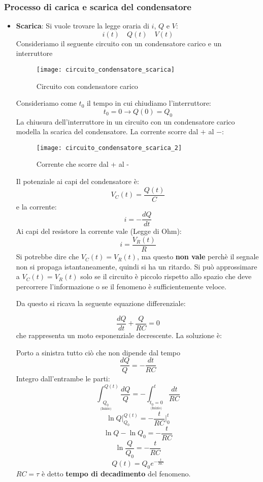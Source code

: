 \documentclass[a4paper]{article}
\begin{document}
\subsubsection{Processo di carica e scarica del condensatore}
\begin{itemize}
  \item \textbf{Scarica}: Si vuole trovare la legge oraria di \( i \), \( Q \) e \( V \):
    \[
      i(t) \quad Q(t) \quad V(t)
    \] 
    Consideriamo il seguente circuito con un condensatore carico e un interruttore
    \begin{figure}[H]
      \centering
      \texttt{[image: circuito\_condensatore\_scarica]}
      \caption{Circuito con condensatore carico}
    \end{figure}
    \noindent
    Consideriamo come \( t_0 \) il tempo in cui chiudiamo l'interruttore:
    \[
      t_0 = 0 \to Q(0) = Q_0
    \] 
    La chiusura dell'interruttore in un circuito con un condensatore carico modella
    la scarica del condensatore. La corrente scorre dal \( + \) al \( - \):
    \begin{figure}[H]
      \centering
      \texttt{[image: circuito\_condensatore\_scarica\_2]}
      \caption{Corrente che scorre dal + al -}
    \end{figure}
    \noindent
    Il potenziale ai capi del condensatore è:
    \[
      V_C(t) = \frac{Q(t)}{C}
    \] 
    e la corrente:
    \[
      i = - \frac{dQ}{dt}
    \] 
    Ai capi del resistore la corrente vale (Legge di Ohm):
    \[
      i = \frac{V_R(t)}{R}
    \] 
    Si potrebbe dire che \( V_C(t) = V_R(t) \), ma questo \textbf{non vale} perchè il segnale
    non si propaga istantaneamente, quindi si ha un ritardo. Si può approssimare
    a \( V_C(t) = V_R(t) \) solo se il circuito è piccolo rispetto allo spazio che 
    deve percorrere l'informazione o se il fenomeno è sufficientemente veloce.

    \vspace{1em}
    \noindent
    Da questo si ricava la seguente equazione differenziale:
    \begin{definition}
    \[
      \frac{dQ}{dt} + \frac{Q}{RC} = 0
    \] 
    che rappresenta un moto esponenziale decrescente. La soluzione è:

    Porto a sinistra tutto ciò che non dipende dal tempo
    \[
      \frac{dQ}{Q} = -\frac{dt}{RC}
    \] 
    Integro dall'entrambe le parti:
    \[
      \int_{\underset{\text{(Inizio)}}{Q_0}}^{Q(t)} \frac{dQ}{Q}
      = -\int_{\underset{\text{(Inizio)}}{t_0 = 0}}^t \frac{dt}{RC}
    \] 
    \[
      \ln Q \bigg|_{Q_0}^{Q(t)} = -\frac{t}{RC} \bigg|_{0}^{t}
    \] 
    \[
      \ln Q - \ln Q_0 = -\frac{t}{RC}
    \] 
    \[
      \ln \frac{Q}{Q_0} = -\frac{t}{RC}
    \] 
    \[
      Q(t) = Q_0 e^{-\frac{t}{RC}}
    \] 
    \( RC = \tau \) è detto \textbf{tempo di decadimento} del fenomeno.


\end{definition}
\end{itemize}
\end{document}
